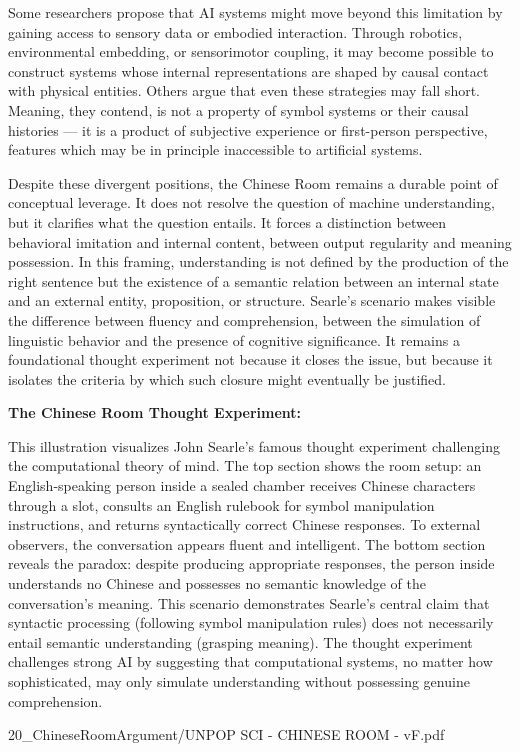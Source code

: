 Some researchers propose that AI systems might move beyond this limitation by gaining access to sensory data or embodied interaction. Through robotics, environmental embedding, or sensorimotor coupling, it may become possible to construct systems whose internal representations are shaped by causal contact with physical entities. Others argue that even these strategies may fall short. Meaning, they contend, is not a property of symbol systems or their causal histories — it is a product of subjective experience or first-person perspective, features which may be in principle inaccessible to artificial systems.

Despite these divergent positions, the Chinese Room remains a durable point of conceptual leverage. It does not resolve the question of machine understanding, but it clarifies what the question entails. It forces a distinction between behavioral imitation and internal content, between output regularity and meaning possession. In this framing, understanding is not defined by the production of the right sentence but the existence of a semantic relation between an internal state and an external entity, proposition, or structure. Searle's scenario makes visible the difference between fluency and comprehension, between the simulation of linguistic behavior and the presence of cognitive significance. It remains a foundational thought experiment not because it closes the issue, but because it isolates the criteria by which such closure might eventually be justified.

\begin{SideNotePage}{
  \textbf{The Chinese Room Thought Experiment:} \par
  This illustration visualizes John Searle's famous thought experiment challenging the computational theory of mind. The top section shows the room setup: an English-speaking person inside a sealed chamber receives Chinese characters through a slot, consults an English rulebook for symbol manipulation instructions, and returns syntactically correct Chinese responses. To external observers, the conversation appears fluent and intelligent. The bottom section reveals the paradox: despite producing appropriate responses, the person inside understands no Chinese and possesses no semantic knowledge of the conversation's meaning. This scenario demonstrates Searle's central claim that syntactic processing (following symbol manipulation rules) does not necessarily entail semantic understanding (grasping meaning). The thought experiment challenges strong AI by suggesting that computational systems, no matter how sophisticated, may only simulate understanding without possessing genuine comprehension.
}{20_ChineseRoomArgument/UNPOP SCI - CHINESE ROOM - vF.pdf}
\end{SideNotePage}